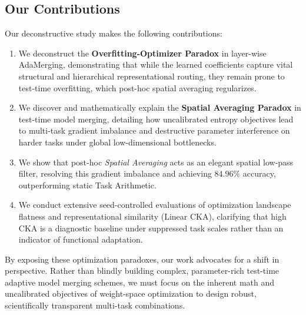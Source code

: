 \subsection{Our Contributions}
Our deconstructive study makes the following contributions:
\begin{enumerate}
    \item We deconstruct the \textbf{Overfitting-Optimizer Paradox} in layer-wise AdaMerging, demonstrating that while the learned coefficients capture vital structural and hierarchical representational routing, they remain prone to test-time overfitting, which post-hoc spatial averaging regularizes.
    \item We discover and mathematically explain the \textbf{Spatial Averaging Paradox} in test-time model merging, detailing how uncalibrated entropy objectives lead to multi-task gradient imbalance and destructive parameter interference on harder tasks under global low-dimensional bottlenecks.
    \item We show that post-hoc \emph{Spatial Averaging} acts as an elegant spatial low-pass filter, resolving this gradient imbalance and achieving $84.96\%$ accuracy, outperforming static Task Arithmetic.
    \item We conduct extensive seed-controlled evaluations of optimization landscape flatness and representational similarity (Linear CKA), clarifying that high CKA is a diagnostic baseline under suppressed task scales rather than an indicator of functional adaptation.
\end{enumerate}

By exposing these optimization paradoxes, our work advocates for a shift in perspective. Rather than blindly building complex, parameter-rich test-time adaptive model merging schemes, we must focus on the inherent math and uncalibrated objectives of weight-space optimization to design robust, scientifically transparent multi-task combinations.

